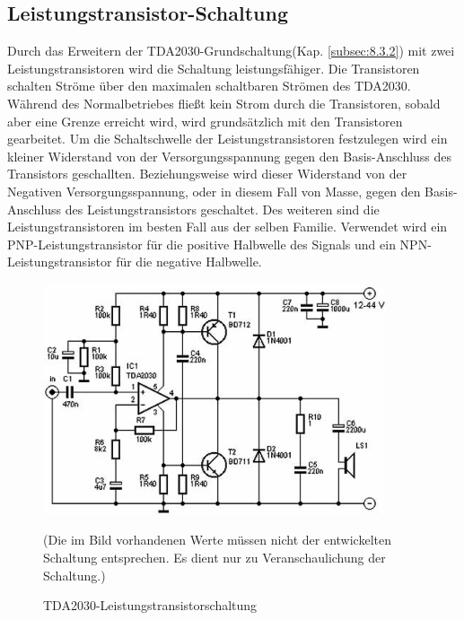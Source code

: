 \subsection{Leistungstransistor-Schaltung}\label{subsec:8.3.3}
Durch das Erweitern der TDA2030-Grundschaltung(Kap. \ref{subsec:8.3.2}) mit zwei Leistungstransistoren wird die Schaltung leistungsfähiger.
Die Transistoren schalten Ströme über den maximalen schaltbaren Strömen des TDA2030. Während des Normalbetriebes fließt kein Strom durch die Transistoren, sobald aber eine Grenze erreicht wird, wird grundsätzlich mit den Transistoren gearbeitet.
Um die Schaltschwelle der Leistungstransistoren festzulegen wird ein kleiner Widerstand von der Versorgungsspannung gegen den Basis-Anschluss des Transistors geschallten.
Beziehungsweise wird dieser Widerstand von der Negativen Versorgungsspannung, oder in diesem Fall von Masse, gegen den Basis-Anschluss des Leistungstransistors geschaltet.
Des weiteren sind die Leistungstransistoren im besten Fall aus der selben Familie.
Verwendet wird ein PNP-Leistungstransistor für die positive Halbwelle des Signals und ein NPN-Leistungstransistor für die negative Halbwelle.
\begin{figure} [H]
	\centering
	\includegraphics[width=0.9\textwidth]{img/Grundlagen/TDA2030/TDA2030-Leistungstransschaltung.jpg}
	\caption[TDA2030-Leistungstransistorschaltung]{TDA2030-Leistungstransistorschaltung\footnotemark}
	\text (Die im Bild vorhandenen Werte müssen nicht der entwickelten Schaltung entsprechen. Es dient nur zu Veranschaulichung der Schaltung.)
	\label {fig:8.3.3.1}
\end{figure}

